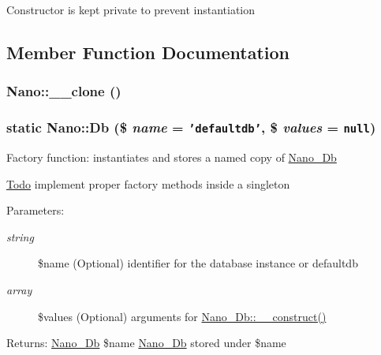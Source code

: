 Constructor is kept private to prevent instantiation 

\subsection{Member Function Documentation}
\hypertarget{classNano_2aa8b559faccc04acba9cfea57952630}{
\subsubsection[{\_\-\_\-clone}]{\setlength{\rightskip}{0pt plus 5cm}Nano::\_\-\_\-clone ()}}
\label{classNano_2aa8b559faccc04acba9cfea57952630}


\hypertarget{classNano_abd2e5c3823a0c0d688b457f882d4c6d}{
\subsubsection[{Db}]{\setlength{\rightskip}{0pt plus 5cm}static Nano::Db (\$ {\em name} = {\tt 'defaultdb'}, \/  \$ {\em values} = {\tt null})}}
\label{classNano_abd2e5c3823a0c0d688b457f882d4c6d}


Factory function: instantiates and stores a named copy of \hyperlink{classNano__Db}{Nano\_\-Db}

\begin{Desc}
\item[\hyperlink{todo__todo000003}{Todo}]implement proper factory methods inside a singleton\end{Desc}
\begin{Desc}
\item[Parameters:]
\begin{description}
\item[{\em string}]\$name (Optional) identifier for the database instance or defaultdb \item[{\em array}]\$values (Optional) arguments for \hyperlink{classNano__Db_c1d07ff4d3efcc8488ea33e88a63b1aa}{Nano\_\-Db::\_\-\_\-construct()}\end{description}
\end{Desc}
\begin{Desc}
\item[Returns:]\hyperlink{classNano__Db}{Nano\_\-Db} \$name \hyperlink{classNano__Db}{Nano\_\-Db} stored under \$name \end{Desc}


